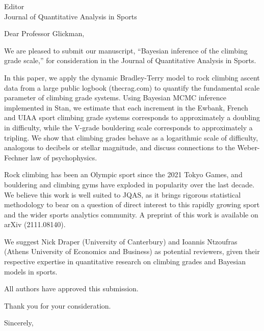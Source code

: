 \documentclass[12pt]{letter}
\begin{document}
\begin{letter}{Editor\\Journal of Quantitative Analysis in Sports}

\opening{Dear Professor Glickman,}

We are pleased to submit our manuscript, ``Bayesian inference of the climbing grade scale,'' for consideration in the Journal of Quantitative Analysis in Sports.

In this paper, we apply the dynamic Bradley-Terry model to rock climbing ascent data from a large public logbook (thecrag.com) to quantify the fundamental scale parameter of climbing grade systems. Using Bayesian MCMC inference implemented in Stan, we estimate that each increment in the Ewbank, French and UIAA sport climbing grade systems corresponds to approximately a doubling in difficulty, while the V-grade bouldering scale corresponds to approximately a tripling. We show that climbing grades behave as a logarithmic scale of difficulty, analogous to decibels or stellar magnitude, and discuss connections to the Weber-Fechner law of psychophysics.

Rock climbing has been an Olympic sport since the 2021 Tokyo Games, and bouldering and climbing gyms have exploded in popularity over the last decade. We believe this work is well suited to JQAS, as it brings rigorous statistical methodology to bear on a question of direct interest to this rapidly growing sport and the wider sports analytics community. A preprint of this work is available on arXiv (2111.08140).

We suggest Nick Draper (University of Canterbury) and Ioannis Ntzoufras (Athens University of Economics and Business) as potential reviewers, given their respective expertise in quantitative research on climbing grades and Bayesian models in sports.

All authors have approved this submission.

Thank you for your consideration.

\closing{Sincerely,}

\end{letter}
\end{document}
